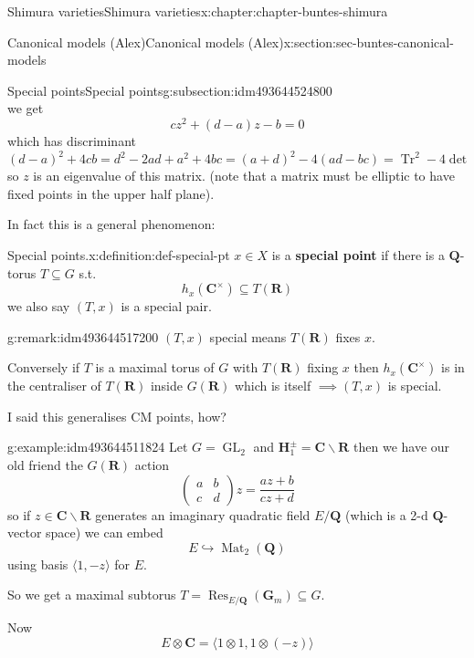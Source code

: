 \documentclass[oneside,10pt,]{book}
\newcommand{\terminology}[1]{\textbf{#1}}
\numberwithin{equation}{section}
\newcommand{\QQ}{\mathbf{Q}}
\newcommand{\RR}{\mathbf{R}}
\newcommand{\CC}{\mathbf{C}}
\DeclareMathOperator{\Res}{Res}
\DeclareMathOperator{\trace}{Tr}
\DeclareMathOperator{\Mat}{Mat}
\DeclareMathOperator{\GL}{GL}
\newcommand{\amp}{&}
\begin{document}
\begin{chapterptx}{Shimura varieties}{}{Shimura varieties}{}{}{x:chapter:chapter-buntes-shimura}
\begin{sectionptx}{Canonical models (Alex)}{}{Canonical models (Alex)}{}{}{x:section:sec-buntes-canonical-models}
\begin{subsectionptx}{Special points}{}{Special points}{}{}{g:subsection:idm493644524800}
\begin{equation*}
\end{equation*}
we get%
\begin{equation*}
cz^2 + (d - a) z - b = 0
\end{equation*}
which has discriminant \((d-a)^2 + 4cb = d^2 - 2ad + a^2 + 4bc =  (a+d)^2 - 4(ad - bc) = \trace^2 - 4\det\) so \(z\) is an eigenvalue of this matrix. (note that a matrix must be elliptic to have fixed points in the upper half plane).%
\par
In fact this is a general phenomenon:%
\begin{definition}{Special points.}{x:definition:def-special-pt}%
\(x \in X\) is a \terminology{special point} if there is a \(\QQ\)-torus \(T \subseteq G\) s.t.%
\begin{equation*}
h_x(\CC^\times) \subseteq T(\RR)
\end{equation*}
we also say \((T,x)\) is a special pair.%
\end{definition}
\begin{remark}{}{g:remark:idm493644517200}%
\((T,x)\) special means \(T(\RR)\) fixes \(x\).%
\par
Conversely if \(T\) is a maximal torus of \(G\) with \(T(\RR)\) fixing \(x\) then \(h_x(\CC^\times)\) is in the centraliser of \(T(\RR)\) inside \(G(\RR)\) which is itself \(\implies (T,x)\) is special.%
\end{remark}
I said this generalises CM points, how?%
\begin{example}{}{g:example:idm493644511824}%
Let \(G = \GL_2\) and \(\mathbf H_1^\pm = \CC \smallsetminus \RR\) then we have our old friend the \(G(\RR)\) action%
\begin{equation*}
\begin{pmatrix} a\amp b \\ c \amp d\end{pmatrix} z = \frac{az + b}{cz+d}
\end{equation*}
so if \(z \in \CC \smallsetminus \RR\) generates an imaginary quadratic field \(E/\QQ\) (which is a 2-d \(\QQ\)-vector space) we can embed%
\begin{equation*}
E \hookrightarrow \Mat_2(\QQ)
\end{equation*}
using basis \(\langle 1, -z\rangle\) for \(E\).%
\par
So we get a maximal subtorus \(T = \Res_{E/\QQ}(\mathbf G_m) \subseteq G\).%
\par
Now%
\begin{equation*}
E\otimes \CC = \langle 1\otimes 1, 1 \otimes (-z)\rangle
\end{equation*}

\end{example}
\end{subsectionptx}
\end{sectionptx}
\end{chapterptx}
\end{document}
